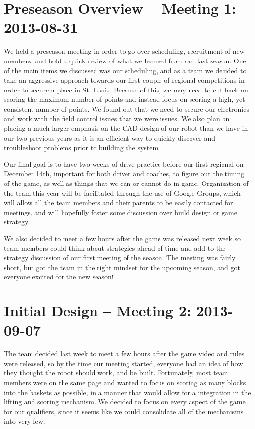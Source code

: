 \documentclass{article}
\begin{document}
\section{Preseason Overview -- Meeting 1: 2013-08-31}
We held a preseason meeting in order to go over scheduling, recruitment of new members, and hold a quick review of what we learned from our last season. One of the main items we discussed was our scheduling, and as a team we decided to take an aggressive approach towards our first couple of regional competitions in order to secure a place in St. Louis. Because of this, we may need to cut back on scoring the maximum number of points and instead focus on scoring a high, yet consistent number of points. We found out that we need to secure our electronics and work with the field control issues that we were issues. We also plan on placing a much larger emphasis on the CAD design of our robot than we have in our two previous years as it is an efficient way to quickly discover and troubleshoot problems prior to building the system. 

Our final goal is to have two weeks of drive practice before our first regional on December 14th, important for both driver and coaches, to figure out the timing of the game, as well as things that we can or cannot do in game. Organization of the team this year will be facilitated through the use of Google Groups, which will allow all the team members and their parents to be easily contacted for meetings, and will hopefully foster some discussion over build design or game strategy. 

We also decided to meet a few hours after the game was released next week so team members could think about strategies ahead of time and add to the strategy discussion of our first meeting of the season. The meeting was fairly short, but got the team in the right mindset for the upcoming season, and got everyone excited for the  new season!

\newpage
\section{Initial Design -- Meeting 2: 2013-09-07}
The team decided last week to meet a few hours after the game video and rules were released, so by the time our meeting started, everyone had an idea of how they thought the robot should work, and be built. Fortunately, most team members were on the same page and wanted to focus on scoring as many blocks into the baskets as possible, in a manner that would allow for a integration in the lifting and scoring mechanism. We decided to focus on every aspect of the game for our qualifiers, since it seems like we could consolidate all of the mechanisms into very few.
\end{document}
